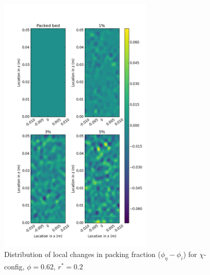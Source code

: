 \begin{figure}[!t]
    \centering
    \includegraphics[width = 0.65\textwidth]{figures/x-62-r125-1-deltas.png}
    \caption{Distribution of local changes in packing fraction ($\phi_{\eta} - \phi_i$) for $\chi$-config, $\phi = 0.62$, $r^* = 0.2$}\label{fig:x-62-r125-deltas}
\end{figure}

